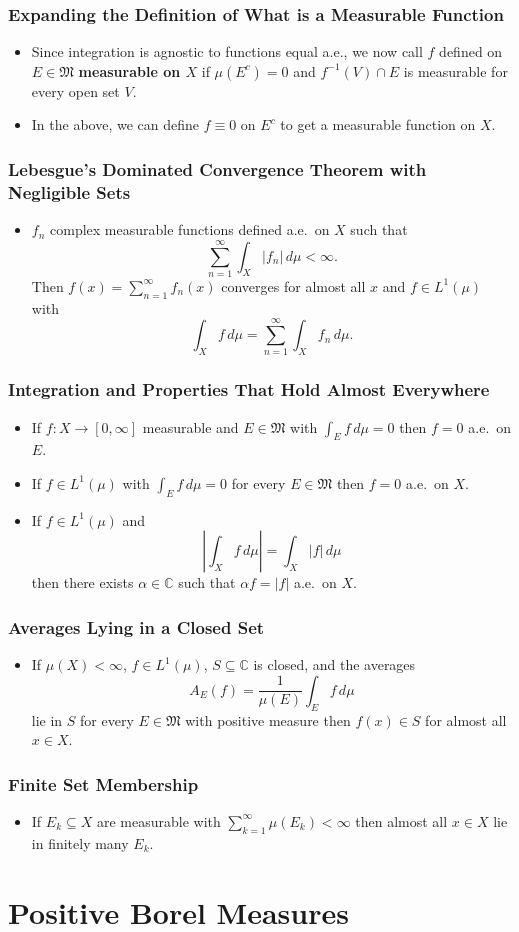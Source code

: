 \documentclass{article}
\newcounter{topicnumber}[section]
\newcommand{\steptopic}[1][1]{\addtocounter{topicnumber}{#1}}
\newenvironment{topic}[1]{%
\steptopic%
\subsubsection{#1}%
\begin{itemize}%
}{%
\end{itemize}%
}
\newcommand{\term}[1]{{\bf #1}}
\newcommand{\remark}{\item}
\begin{document}
\begin{topic}{Expanding the Definition of What is a Measurable Function}
\remark Since integration is agnostic to functions equal a.e., we now call $f$ defined on $E \in \mathfrak{M}$ \term{measurable on $X$} if $\mu(E^c) = 0$ and $f^{-1}(V) \cap E$ is measurable for every open set $V$.
\remark In the above, we can define $f \equiv 0$ on $E^c$ to get a measurable function on $X$.
\end{topic}

\begin{topic}{Lebesgue's Dominated Convergence Theorem with Negligible Sets}
\remark $f_n$ complex measurable functions defined a.e.\ on $X$ such that $$\sum_{n=1}^\infty \int_X |f_n|\,d\mu < \infty.$$ Then $f(x) = \sum_{n=1}^\infty f_n(x)$ converges for almost all $x$ and $f \in L^1(\mu)$ with $$\int_X f\,d\mu = \sum_{n=1}^\infty \int_X f_n\,d\mu.$$
\end{topic}

\begin{topic}{Integration and Properties That Hold Almost Everywhere}
\remark If $f : X \to [0, \infty]$ measurable and $E \in \mathfrak{M}$ with $\int_E f\,d\mu = 0$ then $f = 0$ a.e.\ on $E$.
\remark If $f \in L^1(\mu)$ with $\int_E f\,d\mu = 0$ for every $E \in \mathfrak{M}$ then $f = 0$ a.e.\ on $X$.
\remark If $f \in L^1(\mu)$ and $$\left|\int_X f\,d\mu\right| = \int_X |f|\,d\mu$$ then there exists $\alpha \in \mathbb{C}$ such that $\alpha f = |f|$ a.e.\ on $X$.
\end{topic}

\begin{topic}{Averages Lying in a Closed Set}
\remark If $\mu(X) < \infty$, $f \in L^1(\mu)$, $S \subseteq \mathbb{C}$ is closed, and the averages $$A_E(f) = \dfrac{1}{\mu(E)} \int_E f\,d\mu$$ lie in $S$ for every $E \in \mathfrak{M}$ with positive measure then $f(x) \in S$ for almost all $x \in X$.
\end{topic}

\begin{topic}{Finite Set Membership}
\remark If $E_k \subseteq X$ are measurable with $\sum_{k=1}^\infty \mu(E_k) < \infty$ then almost all $x \in X$ lie in finitely many $E_k$.
\end{topic}


\newpage
\section{Positive Borel Measures}
\end{document}
